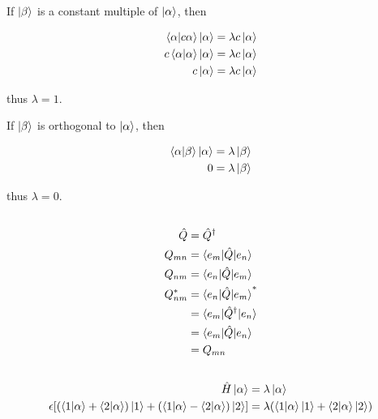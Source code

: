 \documentclass{article}
\begin{document}
If $\ket{\beta}$ is a constant multiple of $\ket{\alpha}$, then

\begin{align*}
  \braket{\alpha | c \alpha} \ket{\alpha} & = \lambda c \ket{\alpha} \\
  c \braket{\alpha | \alpha} \ket{\alpha} & = \lambda c \ket{\alpha} \\
  c \ket{\alpha}                          & = \lambda c \ket{\alpha}
\end{align*}

thus $\lambda = 1$.

If $\ket{\beta}$ is orthogonal to $\ket{\alpha}$, then

\begin{align*}
  \braket{\alpha | \beta} \ket{\alpha} & = \lambda \ket{\beta} \\
  0                                    & = \lambda \ket{\beta}
\end{align*}

thus $\lambda = 0$.

\subsection{}

\begin{align*}
  \hat{Q}   & = \hat{Q}^\dagger                      \\
  Q_{m n}   & = \braket{e_m | \hat{Q} | e_n}         \\
  Q_{n m}   & = \braket{e_n | \hat{Q} | e_m}         \\
  Q_{n m}^* & = \braket{e_n | \hat{Q} | e_m}^*       \\
            & = \braket{e_m | \hat{Q}^\dagger | e_n} \\
            & = \braket{e_m | \hat{Q} | e_n}         \\
            & = Q_{m n}
\end{align*}

\subsection{}

\begin{align*}
  \hat{H} \ket{\alpha}                                                                                                 & = \lambda \ket{\alpha}                                                \\
  \epsilon [(\braket{1 | \alpha} + \braket{2 | \alpha}) \ket{1} + (\braket{1 | \alpha} - \braket{2 | \alpha}) \ket{2}] & = \lambda (\braket{1 | \alpha} \ket{1} + \braket{2 | \alpha} \ket{2})
\end{align*}
\end{document}
